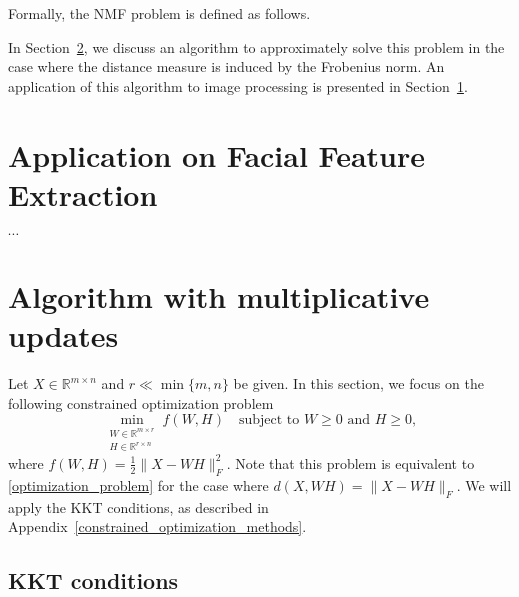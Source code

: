 \documentclass{amsart}
\newcommand{\R}{\mathbb{R}}
\begin{document}
Formally, the NMF problem is defined as follows.

\bigskip

\noindent{}

\bigskip

In Section~\ref{NMF_algorithm}, we discuss an algorithm to approximately solve this problem in the case where the distance measure is induced by the Frobenius norm. An application of this algorithm to image processing is presented in Section~\ref{facial_feature_extraction}.

\section{Application on Facial Feature Extraction} \label{facial_feature_extraction}

$\cdots$

\section{Algorithm with multiplicative updates} \label{NMF_algorithm}

Let $X\in\R^{m\times n}$ and $r \ll\min\{m,n\}$ be given. In this section, we focus on the following constrained optimization problem
\begin{equation}
    \label{optimization_problem_frobenius}
    \min_{\substack{W \in \mathbb{R}^{m \times r} \\ H \in \mathbb{R}^{r \times n}}} f(W,H) \quad \text{subject to } W \geq 0 \text{ and } H \geq 0,
\end{equation}
where $f(W,H)= \frac{1}{2} \|X-WH\|_F^2$. Note that this problem is equivalent to \eqref{optimization_problem} for the case where $d(X,WH)= \|X-WH\|_F$. We will apply the KKT conditions, as described in Appendix~\ref{constrained_optimization_methods}.

\subsection{KKT conditions}
\end{document}
